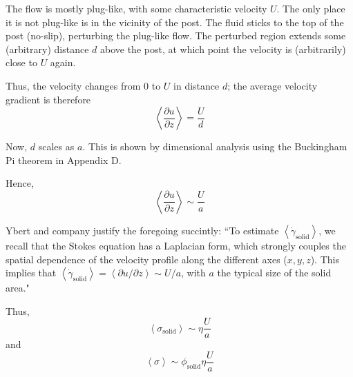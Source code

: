 \documentclass[a4paper]{report}
\newcommand{\phisol}{\ensuremath{\phi_{\mathrm{solid}}}}
\newcommand{\sigsol}{\ensuremath{\sigma_{\mathrm{solid}}}}
\newcommand{\gamsol}{\ensuremath{ \dot{\gamma}_{\mathrm{solid}} }}
\begin{document}
The flow is mostly plug-like, with some characteristic velocity $U$.  The only place it is not plug-like is in the vicinity of the post.  The fluid sticks to the top of the post (no-slip), perturbing the plug-like flow.  The perturbed region extends some (arbitrary) distance $d$ above the post, at which point the velocity is (arbitrarily) close to $U$ again.  

\begin{center}
\end{center}

Thus, the velocity changes from 0 to $U$ in distance $d$; the average velocity gradient is therefore
\begin{equation*}
\left< \frac{\partial u}{\partial z} \right> = \frac{U}{d}
\end{equation*}

Now, $d$ scales as $a$.  This is shown by dimensional analysis using the Buckingham Pi theorem in Appendix D.

Hence,
\begin{equation*}
\left< \frac{\partial u}{\partial z} \right> \sim \frac{U}{a}
\end{equation*}

Ybert and company justify the foregoing succintly: ``To estimate $ \left< \gamsol \right> $, we recall that the Stokes equation has a Laplacian form, which strongly couples the spatial dependence of the velocity profile along the different axes ($x,y,z$). This implies that $ \left< \gamsol \right> = \left< \partial u / \partial z \right> \sim U/a $, with $a$ the typical size of the solid area."

Thus, 
\begin{equation*}
\left< \sigsol \right> \sim \eta \frac{U}{a}
\end{equation*}
and
\begin{equation*}
\left< \sigma \right> \sim \phisol \eta \frac{U}{a}
\end{equation*}
\end{document}
